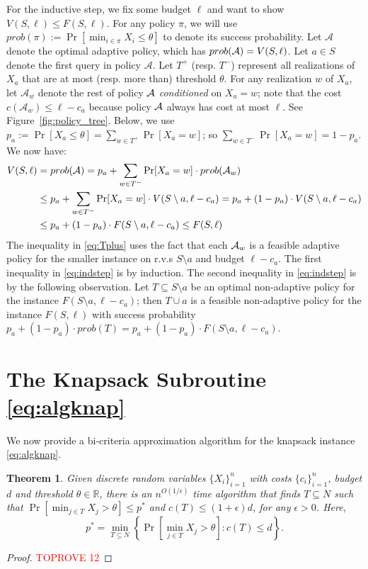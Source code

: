 \documentclass[11pt]{article}
\newtheorem{thm}{Theorem}[section]
\theoremstyle{remark}
\theoremstyle{plain}
\theoremstyle{remark}
\begin{document}
For the inductive step,  we fix some budget $\ell$ and want to show $V(S,\ell ) \leq F(S,\ell)$.  For any policy $\pi$, we will use $prob(\pi):=\Pr[\min_{i\in \pi} X_i\le \theta]$ to denote its success probability.  Let  $\mathcal{A}$
denote the optimal adaptive policy, which has $prob({\cal A}) = V(S,\ell )$. Let $a\in S$ denote the first query in policy  $\mathcal{A}$. Let $T^+$ (resp. $T^-$) represent all realizations of $X_a$ that are at most (resp. more than)  threshold $\theta$. For any realization $w$ of $X_a$, let $\mathcal{A}_w$ denote the rest of  policy ${\cal A}$ {\em conditioned} on $X_a=w$; note that the cost $c(\mathcal{A}_w)\le \ell - c_a$ because policy ${\cal A}$ always has cost at most $\ell$. See Figure~\ref{fig:policy_tree}.  Below, we use $p_a:=\Pr[X_a \le \theta]=\sum_{w\in T^+} \Pr[X_a=w]$; so $\sum_{w\in T^-} \Pr[X_a=w]=1-p_a$. We now have:
\begin{align} 
    V(S,\ell) & =  prob({\cal A}) =  p_a + \sum_{w \in T^-} \Pr[X_a = w] \cdot prob({\cal A}_w)  \notag\\
    & \le  p_a + \sum_{w \in T^-} \Pr[ X_a = w] \cdot V(S \setminus a, \ell - c_a) =  p_a + (1- p_a)\cdot V(S \setminus a, \ell - c_a)   \label{eq:Tplus}\\
     & \leq    p_a + (1 - p_a)\cdot F(S \setminus a, \ell - c_a)  \leq F(S, \ell) \label{eq:indstep}
     \end{align}
The inequality in \eqref{eq:Tplus} uses the fact that each ${\cal A}_w$ is a feasible adaptive policy for the smaller instance on r.v.s $S\setminus a$ and budget $\ell-c_a$. The first inequality in  \eqref{eq:indstep} is by induction. The second inequality in  \eqref{eq:indstep} is by the following observation. Let $T\subseteq S\setminus a$  be an optimal non-adaptive policy for the instance $F(S \setminus a, \ell - c_a)$; then $T\cup a$ is a feasible non-adaptive policy for the instance $F(S,\ell)$ with success probability $p_a + (1-p_a)\cdot prob(T)= p_a + (1 - p_a)\cdot F(S \setminus a, \ell - c_a) $.   


\section{The  Knapsack  Subroutine \texorpdfstring{\eqref{eq:algknap}}{(algknap)}}
\label{app:knapsack}

We now provide a bi-criteria approximation algorithm for the knapsack instance \eqref{eq:algknap}. 
\begin{thm}
\label{thm:knapsack}
    Given discrete random variables  $\{X_i\}_{i=1}^n$ with costs $\{c_i\}_{i=1}^n$, budget $d$ and  threshold $\theta \in \mathbb{R}$, there is an $n^{O(1/\epsilon)}$  time algorithm that finds $T \subseteq N$ such that  $ \Pr\left[ \min_{j \in T} X_j   > \theta \right]\le  p^*$ and $c(T) \leq (1+\epsilon)d$, for any $\epsilon>0$. Here, 
    \[
      p^* = \min_{T \subseteq N } \left\{ \Pr\left[ \min_{j \in T} X_j  > \theta \right] : c(T) \leq d \right\}. \tag{*} \label{KP}
    \]
\end{thm}

\begin{proof}\textcolor{red}{TOPROVE 12}\end{proof}
\end{document}
